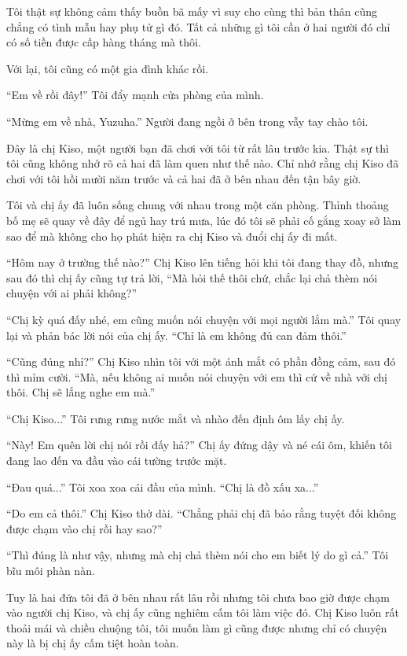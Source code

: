 {Tôi thật sự không cảm thấy buồn bã mấy vì suy cho cùng thì bản thân cũng
chẳng có tình mẫu hay phụ tử gì đó. Tất cả những gì tôi cần ở hai người
đó chỉ có số tiền được cấp hàng tháng mà thôi.

Với lại, tôi cũng có một gia đình khác rồi.

``Em về rồi đây!'' Tôi đẩy mạnh cửa phòng của mình.

``Mừng em về nhà, Yuzuha.'' Người đang ngồi ở bên trong vẫy tay chào
tôi.

Đây là chị Kiso, một người bạn đã chơi với tôi từ rất lâu trước kia.
Thật sự thì tôi cũng không nhớ rõ cả hai đã làm quen như thế nào. Chỉ
nhớ rằng chị Kiso đã chơi với tôi hồi mười năm trước và cả hai đã ở bên
nhau đến tận bây giờ.

Tôi và chị ấy đã luôn sống chung với nhau trong một căn phòng. Thỉnh
thoảng bố mẹ sẽ quay về đây để ngủ hay trú mưa, lúc đó tôi sẽ phải cố
gắng xoay sở làm sao để mà không cho họ phát hiện ra chị Kiso và đuổi
chị ấy đi mất.

``Hôm nay ở trường thế nào?'' Chị Kiso lên tiếng hỏi khi tôi đang thay
đồ, nhưng sau đó thì chị ấy cũng tự trả lời, ``Mà hỏi thế thôi chứ, chắc
lại chả thèm nói chuyện với ai phải không?''

``Chị kỳ quá đấy nhé, em cũng muốn nói chuyện với mọi người lắm mà.''
Tôi quay lại và phản bác lời nói của chị ấy. ``Chỉ là em không đủ can
đảm thôi.''

``Cũng đúng nhỉ?'' Chị Kiso nhìn tôi với một ánh mắt có phần đồng cảm,
sau đó thì mỉm cười. ``Mà, nếu không ai muốn nói chuyện với em thì cứ về
nhà với chị thôi. Chị sẽ lắng nghe em mà.''

``Chị Kiso...'' Tôi rưng rưng nước mắt và nhào đến định ôm lấy chị ấy.

``Này! Em quên lời chị nói rồi đấy hả?'' Chị ấy đứng dậy và né cái ôm,
khiến tôi đang lao đến va đầu vào cái tường trước mặt.

``Đau quá...'' Tôi xoa xoa cái đầu của mình. ``Chị là đồ xấu xa...''

``Do em cả thôi.'' Chị Kiso thở dài. ``Chẳng phải chị đã bảo rằng tuyệt
đối không được chạm vào chị rồi hay sao?''

``Thì đúng là như vậy, nhưng mà chị chả thèm nói cho em biết lý do gì
cả.'' Tôi bĩu môi phàn nàn.

Tuy là hai đứa tôi đã ở bên nhau rất lâu rồi nhưng tôi chưa bao giờ được
chạm vào người chị Kiso, và chị ấy cũng nghiêm cấm tôi làm việc đó. Chị
Kiso luôn rất thoải mái và chiều chuộng tôi, tôi muốn làm gì cũng được
nhưng chỉ có chuyện này là bị chị ấy cấm tiệt hoàn toàn.

}
